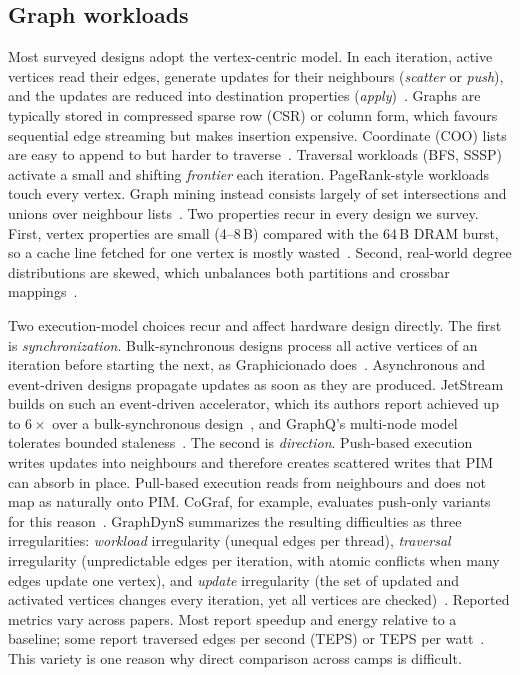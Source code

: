 \documentclass[journal,onecolumn]{IEEEtran}
\begin{document}
\subsection{Graph workloads}
Most surveyed designs adopt the vertex-centric model. In each iteration, active vertices read their edges, generate updates for their neighbours (\emph{scatter} or \emph{push}), and the updates are reduced into destination properties (\emph{apply})~\cite{ham2016graphicionado,yenimol2026cograf}. Graphs are typically stored in compressed sparse row (CSR) or column form, which favours sequential edge streaming but makes insertion expensive. Coordinate (COO) lists are easy to append to but harder to traverse~\cite{asquini2025tc}. Traversal workloads (BFS, SSSP) activate a small and shifting \emph{frontier} each iteration. PageRank-style workloads touch every vertex. Graph mining instead consists largely of set intersections and unions over neighbour lists~\cite{besta2021sisa}. Two properties recur in every design we survey. First, vertex properties are small (4--8\,B) compared with the 64\,B DRAM burst, so a cache line fetched for one vertex is mostly wasted~\cite{shin2025piccolo}. Second, real-world degree distributions are skewed, which unbalances both partitions and crossbar mappings~\cite{zheng2020spara,cai2024pimpam}.

Two execution-model choices recur and affect hardware design directly. The first is \emph{synchronization}. Bulk-synchronous designs process all active vertices of an iteration before starting the next, as Graphicionado does~\cite{ham2016graphicionado}. Asynchronous and event-driven designs propagate updates as soon as they are produced. JetStream builds on such an event-driven accelerator, which its authors report achieved up to $6\times$ over a bulk-synchronous design~\cite{rahman2021jetstream}, and GraphQ's multi-node model tolerates bounded staleness~\cite{zhuo2019graphq}. The second is \emph{direction}. Push-based execution writes updates into neighbours and therefore creates scattered writes that PIM can absorb in place. Pull-based execution reads from neighbours and does not map as naturally onto PIM. CoGraf, for example, evaluates push-only variants for this reason~\cite{yenimol2026cograf}. GraphDynS summarizes the resulting difficulties as three irregularities: \emph{workload} irregularity (unequal edges per thread), \emph{traversal} irregularity (unpredictable edges per iteration, with atomic conflicts when many edges update one vertex), and \emph{update} irregularity (the set of updated and activated vertices changes every iteration, yet all vertices are checked)~\cite{yan2019graphdyns}. Reported metrics vary across papers. Most report speedup and energy relative to a baseline; some report traversed edges per second (TEPS) or TEPS per watt~\cite{lee2022graphwave}. This variety is one reason why direct comparison across camps is difficult.
\end{document}
